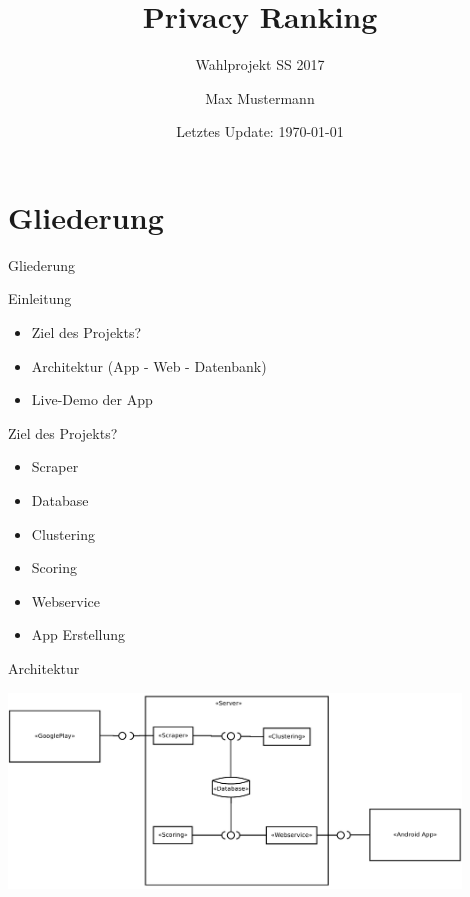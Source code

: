 \documentclass[compress,t]{beamer}
\title{Privacy Ranking}
\subtitle{Wahlprojekt SS 2017}
\date{Letztes Update: \today}
\author{Max Mustermann}
\institute{Studienbereich Informatik\\Hochschule {RheinMain}}
\begin{document}
\maketitle


\section*{Gliederung}
\begin{frame}{Gliederung}
    \tableofcontents[hideallsubsections]
\end{frame}



\begin{frame}{Einleitung}

    \begin{itemize}
        \item Ziel des Projekts?
        \item Architektur (App - Web - Datenbank)
        \item Live-Demo der App
    \end{itemize}

\end{frame}

\begin{frame}{Ziel des Projekts?}

    \begin{itemize}
        \item Scraper
        \item Database
        \item Clustering
        \item Scoring
        \item Webservice
        \item App Erstellung
    \end{itemize}

\end{frame}

\begin{frame}{Architektur}

    \begin{center}
        \includegraphics[width=0.9\textwidth]{img/architecture.png}
    \end{center}

\end{frame}
\end{document}
